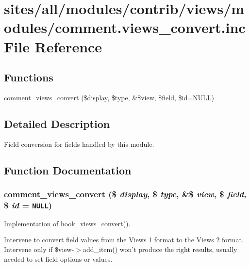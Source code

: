 \hypertarget{comment_8views__convert_8inc}{
\section{sites/all/modules/contrib/views/modules/comment.views\_\-convert.inc File Reference}
\label{comment_8views__convert_8inc}
}
\subsection*{Functions}
\begin{CompactItemize}
\item 
\hyperlink{comment_8views__convert_8inc_d74f7f8d94a7fa3f0963090dca11fce5}{comment\_\-views\_\-convert} (\$display, \$type, \&\$\hyperlink{classview}{view}, \$field, \$id=NULL)
\end{CompactItemize}


\subsection{Detailed Description}
Field conversion for fields handled by this module. 

\subsection{Function Documentation}
\hypertarget{comment_8views__convert_8inc_d74f7f8d94a7fa3f0963090dca11fce5}{
\subsubsection[{comment\_\-views\_\-convert}]{\setlength{\rightskip}{0pt plus 5cm}comment\_\-views\_\-convert (\$ {\em display}, \/  \$ {\em type}, \/  \&\$ {\em view}, \/  \$ {\em field}, \/  \$ {\em id} = {\tt NULL})}}
\label{comment_8views__convert_8inc_d74f7f8d94a7fa3f0963090dca11fce5}


Implementation of \hyperlink{group__views__hooks_ge98b0a1c700fe1406af390dfc8c7262e}{hook\_\-views\_\-convert()}.

Intervene to convert field values from the Views 1 format to the Views 2 format. Intervene only if \$view-$>$add\_\-item() won't produce the right results, usually needed to set field options or values. 